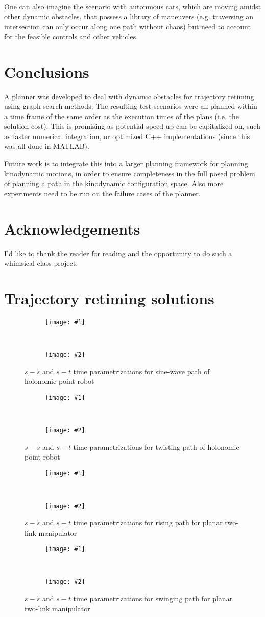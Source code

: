 \documentclass[letterpaper,12pt]{article} %
\newcommand{\ffigdoublevert}[4]{
    \begin{figure}[h!]
    \centering

    \begin{subfigure}[t!]{0.7\linewidth}
    \texttt{[image: \#1]}
    \caption{}
    \label{fig:#4L}
    \end{subfigure}
    ~
    \begin{subfigure}[b!]{0.7\linewidth}
    \texttt{[image: \#2]}
    \caption{}
    \label{fig:#4R}
    \end{subfigure}

    \caption{#3}
    \label{fig:#4}
    \end{figure}
}
\begin{document}
One can also imagine the scenario with autonmous cars, which are moving amidst other dynamic obstacles, that possess a library of maneuvers (e.g. traversing an intersection can only occur along one path without chaos) but need to account for the feasible controls and other vehicles.

\section{Conclusions}

A planner was developed to deal with dynamic obstacles for trajectory retiming using graph search methods. The resulting test scenarios were all planned within a time frame of the same order as the execution times of the plans (i.e. the solution cost). This is promising as potential speed-up can be capitalized on, such as faster numerical integration, or optimized C++ implementations (since this was all done in MATLAB).

Future work is to integrate this into a larger planning framework for planning kinodynamic motions, in order to ensure completeness in the full posed problem of planning a path in the kinodynamic configuration space. Also more experiments need to be run on the failure cases of the planner.

\section{Acknowledgements}

I'd like to thank the reader for reading and the opportunity to do such a whimsical class project.






\newpage
\appendix
\section{Trajectory retiming solutions}

\ffigdoublevert{pics/plans/trans1}{pics/plans/trans2}{$s-\dot{s}$ and $s-t$ time parametrizations for sine-wave path of holonomic point robot}{a1}
\ffigdoublevert{pics/plans/twist1}{pics/plans/twist2}{$s-\dot{s}$ and $s-t$ time parametrizations for twisting path of holonomic point robot}{a2}
\ffigdoublevert{pics/plans/raise1}{pics/plans/raise2}{$s-\dot{s}$ and $s-t$ time parametrizations for rising path for planar two-link manipulator}{a3}
\ffigdoublevert{pics/plans/swing1}{pics/plans/swing2}{$s-\dot{s}$ and $s-t$ time parametrizations for swinging path for planar two-link manipulator}{a4}

\end{document}
